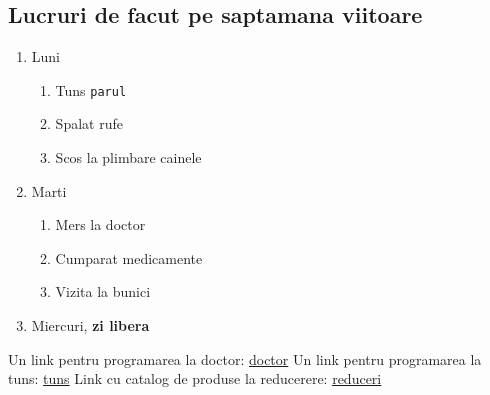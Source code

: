 \documentclass{article}
\begin{document}
\subsection{Lucruri de facut pe saptamana viitoare}
\begin{enumerate}
    \item Luni
    \begin{enumerate}
        \item Tuns \texttt{parul}
        \item Spalat rufe   
        \item Scos la plimbare cainele
    \end{enumerate}
    \item Marti
    \begin{enumerate}
        \item Mers la doctor
        \item Cumparat medicamente
        \item Vizita la bunici
    \end{enumerate}
    \item Miercuri, \textbf{zi libera}
\end{enumerate}

Un link pentru programarea la doctor: \href{https://www.google.com/doctor}{doctor}
Un link pentru programarea la tuns: \href{https://www.google.com/tuns}{tuns}
Link cu catalog de produse la reducerere: \href{https://www.google.com/reduceri}{reduceri}
\end{document}

